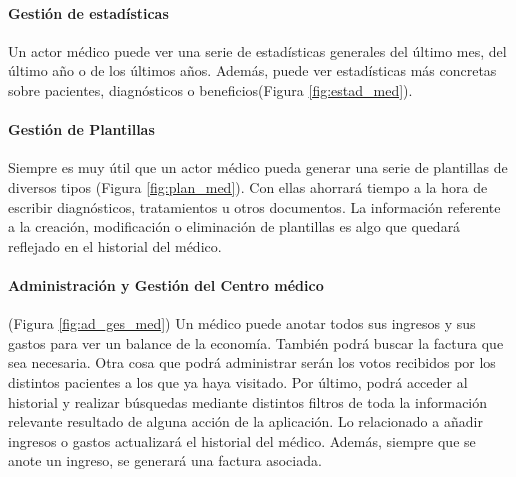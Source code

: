 \documentclass[a4paper,oneside,11pt]{book}
\begin{document}
			\paragraph{Gestión de estadísticas} %
			\label{par:gestion_de_estadisticas}
				Un actor médico puede ver una serie de estadísticas generales del último mes, del último año o de los últimos años. Además, puede ver estadísticas más concretas sobre pacientes, diagnósticos o beneficios(Figura \ref{fig:estad_med}). 
				
			
			\paragraph{Gestión de Plantillas} %
			\label{par:gestion_de_plantillas}
				Siempre es muy útil que un actor médico pueda generar una serie de plantillas de diversos tipos (Figura \ref{fig:plan_med}). Con ellas ahorrará tiempo a la hora de escribir diagnósticos, tratamientos u otros documentos. La información referente a la creación, modificación o eliminación de plantillas es algo que quedará reflejado en el historial del médico.
				
			
			\paragraph{Administración y Gestión del Centro médico} %
			\label{par:administracion_y_gestion_del_centro_medico}
				
				(Figura \ref{fig:ad_ges_med}) Un médico puede anotar todos sus ingresos y sus gastos para ver un balance de la economía. También podrá buscar la factura que sea necesaria. Otra cosa que podrá administrar serán los votos recibidos por los distintos pacientes a los que ya haya visitado. Por último, podrá acceder al historial y realizar búsquedas mediante distintos filtros de toda la información relevante resultado de alguna acción de la aplicación. Lo relacionado a añadir ingresos o gastos actualizará el historial del médico. Además, siempre que se anote un ingreso, se generará una factura asociada.
				
\end{document}
